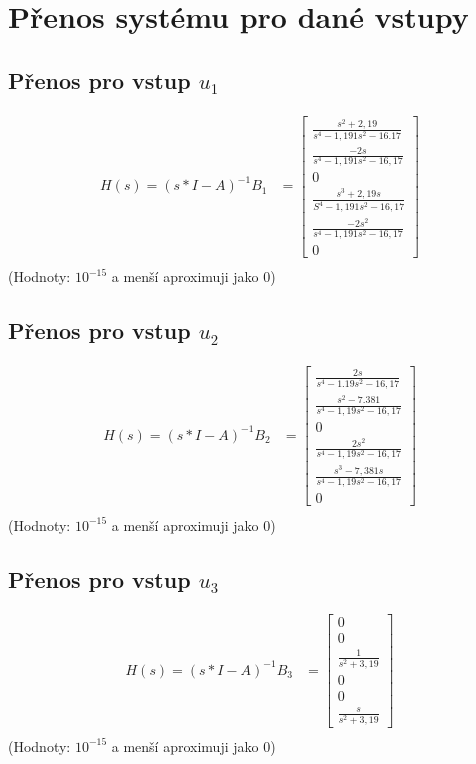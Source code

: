 \documentclass{article}
\newcommand\mat[1]{\begin{bmatrix}#1\end{bmatrix}}
\begin{document}
\section{Přenos systému pro dané vstupy}

\subsection{Přenos pro vstup $u_1$}
\begin{align*}
    H(s) = (s*I-A)^{-1}B_1 &=\mat{\frac{s^2 + 2,19}{s^4-1,191 s^2 -16.17}\\
                               \frac{-2s}{s^4-1,191s^2-16,17}\\
                               0\\
                               \frac{s^3+2,19s}{S^4-1,191s^2-16,17}\\
                               \frac{-2s^2}{s^4-1,191s^2-16,17}\\
                               0}\\
\end{align*}
(Hodnoty: $10^{-15}$ a menší aproximuji jako 0)

\subsection{Přenos pro vstup $u_2$}
\begin{align*}
    H(s) = (s*I-A)^{-1}B_2 &=\mat{\frac{2s}{s^4-1.19s^2-16,17}\\
                               \frac{s^2-7.381}{s^4-1,19s^2-16,17}\\
                               0\\
                               \frac{2s^2}{s^4-1,19s^2-16,17}\\
                               \frac{s^3-7,381s}{s^4-1,19s^2-16,17}\\
                               0}\\
\end{align*}
(Hodnoty: $10^{-15}$ a menší aproximuji jako 0)

\subsection{Přenos pro vstup $u_3$}
\begin{align*}
    H(s) = (s*I-A)^{-1}B_3 &=\mat{0\\
                               0\\
                               \frac{1}{s^2+3,19}\\
                               0\\
                               0\\
                               \frac{s}{s^2+3,19}}\\
\end{align*}
(Hodnoty: $10^{-15}$ a menší aproximuji jako 0)\\
\end{document}
